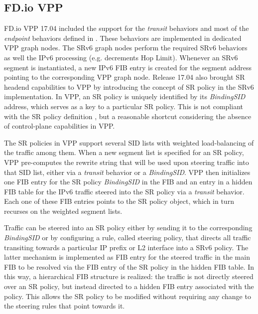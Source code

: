 \subsection{FD.io VPP}
\label{sec:vpp}

FD.io VPP \cite{fd-io-vpp} 17.04 included the support for the \textit{transit} behaviors and most of the \textit{endpoint} behaviors defined in \cite{id-srv6-network-prog}. These behaviors are implemented in dedicated VPP graph nodes. The SRv6 graph nodes perform the required SRv6 behaviors as well the IPv6 processing (e.g. decrements Hop Limit). Whenever an SRv6 segment is instantiated, a new IPv6 FIB entry is created for the segment address pointing to the corresponding VPP graph node. Release 17.04 also brought SR headend capabilities to VPP by introducing the concept of SR policy in the SRv6 implementation. In VPP, an SR policy is uniquely identified by its \textit{BindingSID} address, which serves as a key to a particular SR policy. This is not compliant with the SR policy definition \cite{id-segment-routing-policy}, but a reasonable shortcut considering the absence of control-plane capabilities in VPP. 

The SR policies in VPP support several SID lists with weighted load-balancing of the traffic among them. When a new segment list is specified for an SR policy, VPP pre-computes the rewrite string that will be used upon steering traffic into that SID list, either via a \textit{transit} behavior or a \textit{BindingSID}. VPP then initializes one FIB entry for the SR policy \textit{BindingSID} in the FIB and an entry in a hidden FIB table for the IPv6 traffic steered into the SR policy via a \textit{transit} behavior. Each one of these FIB entries points to the SR policy object, which in turn recurses on the weighted segment lists.

Traffic can be steered into an SR policy either by sending it to the corresponding \textit{BindingSID} or by configuring a rule, called steering policy, that directs all traffic transiting towards a particular IP prefix or L2 interface into a SRv6 policy. The latter mechanism is implemented as FIB entry for the steered traffic in the main FIB to be resolved via the FIB entry of the SR policy in the hidden FIB table. In this way, a hierarchical FIB structure is realized: the traffic is not directly steered over an SR policy, but instead directed to a hidden FIB entry associated with the policy. This allows the SR policy to be modified without requiring any change to the steering rules that point towards it.

